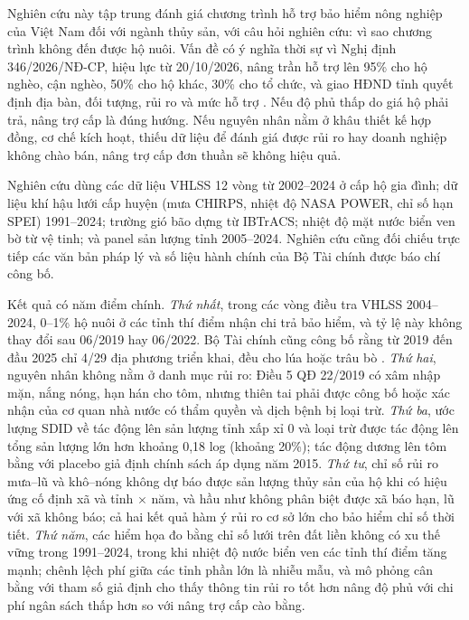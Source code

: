 \documentclass[12pt,a4paper]{article}
\begin{document}
Nghiên cứu này tập trung đánh giá chương trình hỗ trợ bảo hiểm nông nghiệp của Việt Nam đối với ngành thủy sản, với câu hỏi nghiên cứu: vì sao chương trình không đến được hộ nuôi. Vấn đề có ý nghĩa thời sự vì Nghị định 346/2026/NĐ-CP, hiệu lực từ 20/10/2026, nâng trần hỗ trợ lên 95\% cho hộ nghèo, cận nghèo, 50\% cho hộ khác, 30\% cho tổ chức, và giao HĐND tỉnh quyết định địa bàn, đối tượng, rủi ro và mức hỗ trợ \parencite{decree346_2026,tckttc2026nd346}. Nếu độ phủ thấp do giá hộ phải trả, nâng trợ cấp là đúng hướng. Nếu nguyên nhân nằm ở khâu thiết kế hợp đồng, cơ chế kích hoạt, thiếu dữ liệu để đánh giá được rủi ro hay doanh nghiệp không chào bán, nâng trợ cấp đơn thuần sẽ không hiệu quả.

Nghiên cứu dùng các dữ liệu VHLSS 12 vòng từ 2002--2024 ở cấp hộ gia đình; dữ liệu khí hậu lưới cấp huyện (mưa CHIRPS, nhiệt độ NASA POWER, chỉ số hạn SPEI) 1991--2024; trường gió bão dựng từ IBTrACS; nhiệt độ mặt nước biển ven bờ từ vệ tinh; và panel sản lượng tỉnh 2005--2024. Nghiên cứu cũng đối chiếu trực tiếp các văn bản pháp lý và số liệu hành chính của Bộ Tài chính được báo chí công bố.

Kết quả có năm điểm chính. \textit{Thứ nhất}, trong các vòng điều tra VHLSS 2004--2024, 0--1\% hộ nuôi ở các tỉnh thí điểm nhận chi trả bảo hiểm, và tỷ lệ này không thay đổi sau 06/2019 hay 06/2022. Bộ Tài chính cũng công bố rằng từ 2019 đến đầu 2025 chỉ 4/29 địa phương triển khai, đều cho lúa hoặc trâu bò \parencite{tbtc2025nd58}. \textit{Thứ hai}, nguyên nhân không nằm ở danh mục rủi ro: Điều 5 QĐ 22/2019 có xâm nhập mặn, nắng nóng, hạn hán cho tôm, nhưng thiên tai phải được công bố hoặc xác nhận của cơ quan nhà nước có thẩm quyền và dịch bệnh bị loại trừ. \textit{Thứ ba}, ước lượng SDID về tác động lên sản lượng tỉnh xấp xỉ 0 và loại trừ được tác động lên tổng sản lượng lớn hơn khoảng 0,18 log (khoảng 20\%); tác động dương lên tôm bằng với placebo giả định chính sách áp dụng năm 2015. \textit{Thứ tư}, chỉ số rủi ro mưa--lũ và khô--nóng không dự báo được sản lượng thủy sản của hộ khi có hiệu ứng cố định xã và tỉnh $\times$ năm, và hầu như không phân biệt được xã báo hạn, lũ với xã không báo; cả hai kết quả hàm ý rủi ro cơ sở lớn cho bảo hiểm chỉ số thời tiết. \textit{Thứ năm}, các hiểm họa đo bằng chỉ số lưới trên đất liền không có xu thế vững trong 1991--2024, trong khi nhiệt độ nước biển ven các tỉnh thí điểm tăng mạnh; chênh lệch phí giữa các tỉnh phần lớn là nhiễu mẫu, và mô phỏng cân bằng với tham số giả định cho thấy thông tin rủi ro tốt hơn nâng độ phủ với chi phí ngân sách thấp hơn so với nâng trợ cấp cào bằng.
\end{document}
